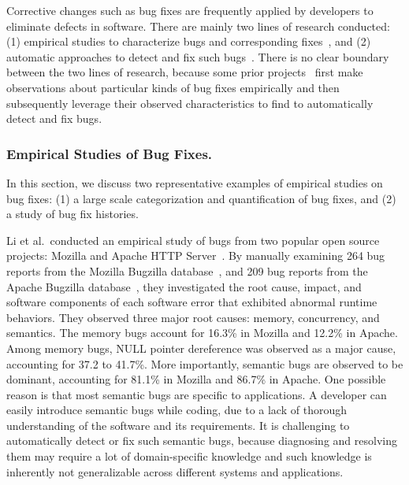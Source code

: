 Corrective changes such as bug fixes are frequently applied by developers to eliminate defects in software. There are mainly two lines of research conducted: (1) empirical studies to characterize bugs and corresponding fixes~\cite{Fenton2000:QAF,Li2006:TCE,Kim2006:MBF,Lu2008:LMC,Nguyen2010:RBF,Yin2011:FBB,Park2012:supplementary,Zhong2015:ESR}, and (2) automatic approaches to detect and fix such bugs~\cite{Engler2000:CSR,Bush2000:SAF,Hangal2002:TDS,Hovemeyer2004:FBE,Naik2006:ESR,Weimer2009:AFP}. There is no clear boundary between the two lines of research, because some prior projects~\cite{Li2006:CPMiner,Pham2010:DRS,Jin2012:UDR,Kim2013:PAR} first make observations about particular kinds of bug fixes empirically and then subsequently leverage their observed characteristics to find to automatically detect and fix bugs.

\subsubsection{Empirical Studies of Bug Fixes.}
In this section, we discuss two representative examples of empirical studies on bug fixes: (1) a large scale categorization and quantification of bug fixes, and (2) a study of bug fix histories. 
 
Li et al.~conducted an empirical study of bugs from two popular open source projects: Mozilla and Apache HTTP Server~\cite{Li2006:TCE}. By manually examining 264 bug reports from the Mozilla Bugzilla database~\cite{mozilla}, and 209 bug reports from the Apache Bugzilla database~\cite{asf}, they investigated the root cause, impact, and software components of each software error that exhibited abnormal runtime behaviors. They observed three major root causes: memory, concurrency, and semantics. The memory bugs account for 16.3\% in Mozilla and 12.2\% in Apache. Among memory bugs, NULL pointer dereference was observed as a major cause, accounting for 37.2 to 41.7\%. More importantly, semantic bugs are observed to be dominant, accounting for 81.1\% in Mozilla and 86.7\% in Apache. One possible reason is that most semantic bugs are specific to applications. A developer can easily introduce semantic bugs while coding, due to a lack of thorough understanding of the software and its requirements. It is challenging to automatically detect or fix such semantic bugs, because diagnosing and resolving them may require a lot of domain-specific knowledge and such knowledge is inherently not generalizable across different systems and applications.   

